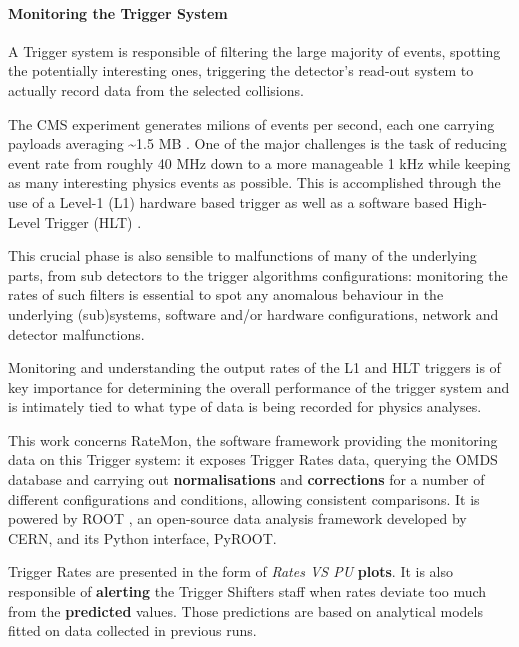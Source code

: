 \documentclass[a4, oneside, 10pt, nobib]{memoir}
\begin{document}
		\paragraph{Monitoring the Trigger System}

		A Trigger system is responsible of filtering the large majority of events, spotting the potentially interesting ones, triggering the detector's read-out system to actually record data from the selected collisions.

		The CMS experiment generates milions of events per second, each one carrying payloads averaging \~{}1.5 MB \cite{smdaqatlhc2016v3pdf-2020-10-12}. One of the major challenges is the task of reducing event rate from roughly 40 MHz down to a more manageable 1 kHz while keeping as many interesting physics events as possible. This is accomplished through the use of a Level-1 (L1) \cite{Bayatyan:706847} hardware based trigger as well as a software based High-Level Trigger (HLT) \cite{Khachatryan_2017}. 



		This crucial phase is also sensible to malfunctions of many of the underlying parts, from sub detectors to the trigger algorithms configurations: monitoring the rates of such filters is essential to spot any anomalous behaviour in the underlying (sub)systems, software and/or hardware configurations, network and detector malfunctions.



		Monitoring and understanding the output rates of the L1 and HLT triggers is of key importance for determining the overall performance of the trigger system and is intimately tied to what type of data is being recorded for physics analyses.





		This work concerns RateMon, the software framework providing the monitoring data on this Trigger system: it exposes Trigger Rates data, querying the OMDS database and carrying out \textbf{normalisations} and \textbf{corrections} for a number of different configurations and conditions, allowing consistent comparisons. It is powered by ROOT \cite{Brun:1997pa}, an open-source data analysis framework developed by CERN, and its Python interface, PyROOT.


		Trigger Rates are presented in the form of \textit{Rates VS PU} \textbf{plots}. It is also responsible of \textbf{alerting} the Trigger Shifters staff when rates deviate too much from the \textbf{predicted} values. Those predictions are based on analytical models fitted on data collected in previous runs.
\end{document}
